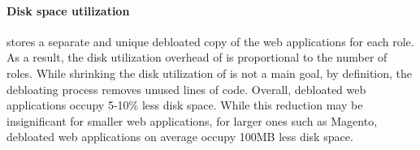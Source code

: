 \paragraph{Disk space utilization} \sys{} stores a separate and unique debloated copy of the web applications for each role. 
As a result, the disk utilization overhead of \sys{} is proportional to the number of roles. 
While shrinking the disk utilization of \sys{} is not a main goal, by definition, the debloating process removes unused lines of code. 
Overall, debloated web applications occupy 5-10\% less disk space. 
While this reduction may be insignificant for smaller web applications, for larger ones such as Magento, debloated web applications on average occupy 100MB less disk space. 


\begin{table}[]
    \centering
    \caption{Average CPU and Memory utilization of \sys. \textit{DBLTR N}-Web Servers row shows the range of CPU and Memory utilization for \textit{DBLTR 1} to \textit{DBLTR 50}.}
    \label{tab:performance}
\end{table}